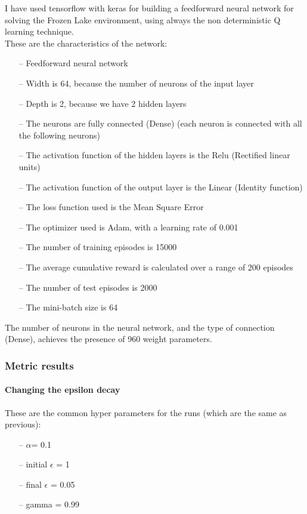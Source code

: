 \documentclass{article}
\begin{document}
I have used tensorflow with keras for building a feedforward neural network for solving the Frozen Lake environment, using always the non deterministic Q learning technique.
\\
These are the characteristics of the network:
\begin{itemize}
\item[--] Feedforward neural network
\item[--] Width is 64, because the number of neurons of the input layer
\item[--] Depth is 2, because we have 2 hidden layers
\item[--] The neurons are fully connected (Dense) (each neuron is connected with all the following neurons)
\item[--] The activation function of the hidden layers is the Relu (Rectified linear units)
\item[--] The activation function of the output layer is the Linear (Identity function)
\item[--] The loss function used is the Mean Square Error
\item[--] The optimizer used is Adam, with a learning rate of 0.001
\item[--] The number of training episodes is 15000
\item[--] The average cumulative reward is calculated over a range of 200 episodes
\item[--] The number of test episodes is 2000
\item[--] The mini-batch size is 64
\end{itemize}





The number of neurons in the neural network, and the type of connection (Dense), achieves the presence of 960 weight parameters.

\subsubsection{Metric results}


\paragraph{Changing the epsilon decay}


These are the common hyper parameters for the runs (which are the same as previous):
\begin{itemize}
\item[--] $\alpha$= 0.1
\item[--] initial $\epsilon$ = 1
\item[--] final $\epsilon$ = 0.05
\item[--] gamma = 0.99
\end{itemize}
\end{document}
